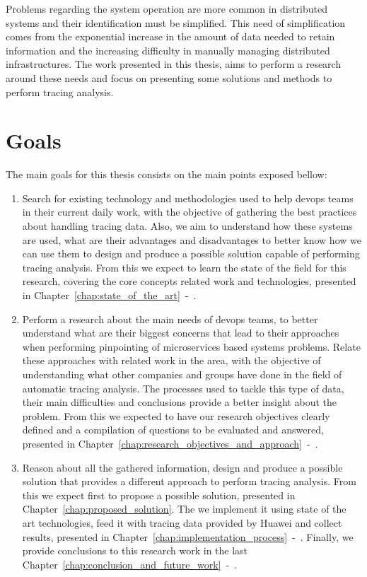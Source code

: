 Problems regarding the system operation are more common in distributed systems and their identification must be simplified. This need of simplification comes from the exponential increase in the amount of data needed to retain information and the increasing difficulty in manually managing distributed infrastructures. The work presented in this thesis, aims to perform a research around these needs and focus on presenting some solutions and methods to perform tracing analysis.

\section{Goals}
\label{sec:goals}

The main goals for this thesis consists on the main points exposed bellow:

\begin{enumerate}
    \item Search for existing technology and methodologies used to help \gls{devops} teams in their current daily work, with the objective of gathering the best practices about handling tracing data. Also, we aim to understand how these systems are used, what are their advantages and disadvantages to better know how we can use them to design and produce a possible solution capable of performing tracing analysis. From this we expect to learn the state of the field for this research, covering the core concepts related work and technologies, presented in Chapter~\ref{chap:state_of_the_art}~-~.
    \item Perform a research about the main needs of \gls{devops} teams, to better understand what are their biggest concerns that lead to their approaches when performing pinpointing of microservices based systems problems. Relate these approaches with related work in the area, with the objective of understanding what other companies and groups have done in the field of automatic tracing analysis. The processes used to tackle this type of data, their main difficulties and conclusions provide a better insight about the problem. From this we expected to have our research objectives clearly defined and a compilation of questions to be evaluated and answered, presented in Chapter~\ref{chap:research_objectives_and_approach}~-~.
    \item Reason about all the gathered information, design and produce a possible solution that provides a different approach to perform tracing analysis. From this we expect first to propose a possible solution, presented in Chapter~\ref{chap:proposed_solution}. The we implement it using state of the art technologies, feed it with tracing data provided by Huawei and collect results, presented in Chapter~\ref{chap:implementation_process}~-~. Finally, we provide conclusions to this research work in the last Chapter~\ref{chap:conclusion_and_future_work}~-~.
\end{enumerate}

